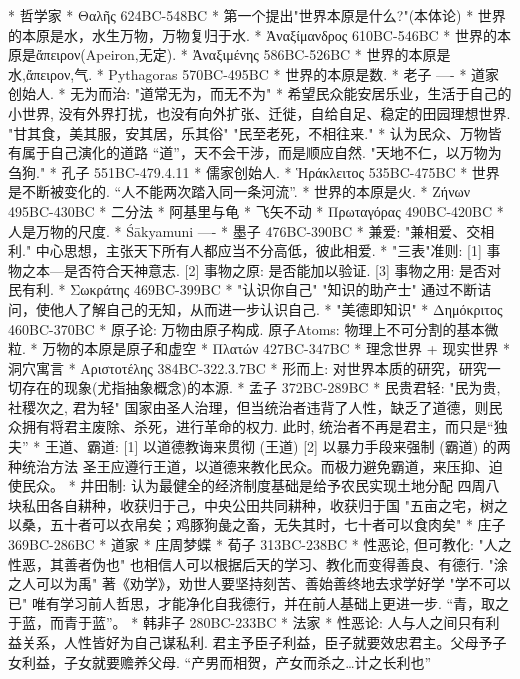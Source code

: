 
* 哲学家
	* Θαλῆς   	624BC-548BC
		* 第一个提出"世界本原是什么?"(本体论)
		* 世界的本原是水，水生万物，万物复归于水.
	* Ἀναξίμανδρος	610BC-546BC
		* 世界的本原是ἄπειρον(Apeiron,无定).
	* Ἀναξιμένης	586BC-526BC
		* 世界的本原是水,ἄπειρον,气.
	* Pythagoras	570BC-495BC
		* 世界的本原是数.
	* 老子	----
		* 道家创始人.
		* 无为而治: "道常无为，而无不为"
		* 希望民众能安居乐业，生活于自己的小世界, 没有外界打扰，也没有向外扩张、迁徙，自给自足、稳定的田园理想世界.
			"甘其食，美其服，安其居，乐其俗"  "民至老死，不相往来."
		* 认为民众、万物皆有属于自己演化的道路 “道”，天不会干涉，而是顺应自然.  "天地不仁，以万物为刍狗."
	* 孔子	551BC-479.4.11
		* 儒家创始人.
	* Ἡράκλειτος	535BC-475BC
		* 世界是不断被变化的.  “人不能两次踏入同一条河流”.
		* 世界的本原是火.
	* Ζήνων  	495BC-430BC
		* 二分法 * 阿基里与龟 * 飞矢不动
	* Πρωταγόρας	490BC-420BC
		* 人是万物的尺度.
	* Śākyamuni	----
	* 墨子	476BC-390BC
		* 兼爱: "兼相爱、交相利."  中心思想，主张天下所有人都应当不分高低，彼此相爱.
		* "三表"准则: [1] 事物之本—是否符合天神意志. [2] 事物之原: 是否能加以验证. [3] 事物之用: 是否对民有利.
	* Σωκράτης	469BC-399BC
		* "认识你自己"  "知识的助产士"  通过不断诘问，使他人了解自己的无知，从而进一步认识自己.
		* "美德即知识"
	* Δημόκριτος	460BC-370BC
		* 原子论: 万物由原子构成. 原子Atoms: 物理上不可分割的基本微粒.
		* 万物的本原是原子和虚空
	* Πλατών	427BC-347BC
		* 理念世界 + 现实世界
		* 洞穴寓言
	* Αριστοτέλης	384BC-322.3.7BC
		* 形而上: 对世界本质的研究，研究一切存在的现象(尤指抽象概念)的本源.
	* 孟子	372BC-289BC
		* 民贵君轻: "民为贵, 社稷次之, 君为轻"
			国家由圣人治理，但当统治者违背了人性，缺乏了道德，则民众拥有将君主废除、杀死，进行革命的权力.
			此时, 统治者不再是君主，而只是“独夫”
		* 王道、霸道: [1] 以道德教诲来贯彻 (王道)  [2] 以暴力手段来强制 (霸道)  的两种统治方法
			圣王应遵行王道，以道德来教化民众。而极力避免霸道，来压抑、迫使民众。 
		* 井田制: 认为最健全的经济制度基础是给予农民实现土地分配
			四周八块私田各自耕种，收获归于己，中央公田共同耕种，收获归于国
			"五亩之宅，树之以桑，五十者可以衣帛矣；鸡豚狗彘之畜，无失其时，七十者可以食肉矣"
	* 庄子	369BC-286BC
		* 道家
		* 庄周梦蝶
	* 荀子	313BC-238BC
		* 性恶论, 但可教化: "人之性恶，其善者伪也"  
			也相信人可以根据后天的学习、教化而变得善良、有德行.  "涂之人可以为禹"
			著《劝学》，劝世人要坚持刻苦、善始善终地去求学好学  "学不可以已"
			唯有学习前人哲思，才能净化自我德行，并在前人基础上更进一步.  “青，取之于蓝，而青于蓝”。
	* 韩非子	280BC-233BC
		* 法家
		* 性恶论: 人与人之间只有利益关系，人性皆好为自己谋私利.
			君主予臣子利益，臣子就要效忠君主。父母予子女利益，子女就要赡养父母.
			“产男而相贺，产女而杀之…计之长利也”
